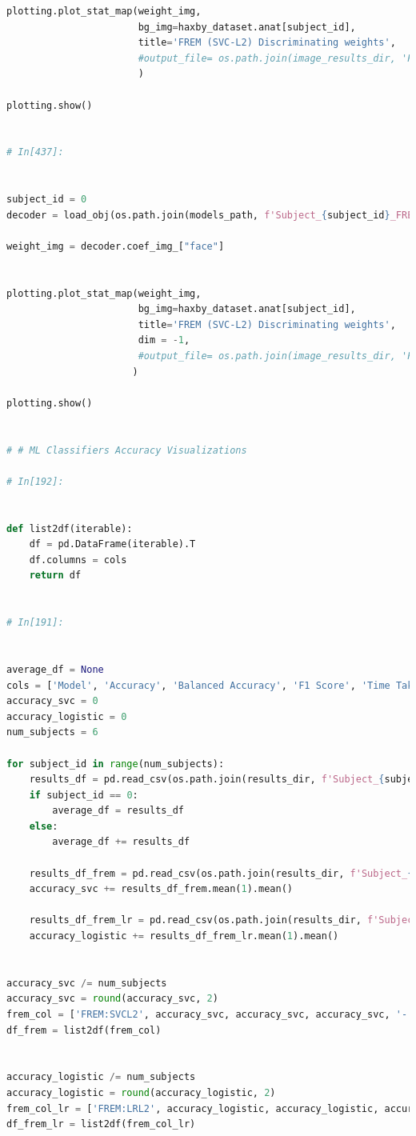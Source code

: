 \documentclass[10pt, twocolumn, letterpaper]{article}
\begin{document}
\begin{lstlisting}[language=Python]
plotting.plot_stat_map(weight_img,
                       bg_img=haxby_dataset.anat[subject_id],
                       title='FREM (SVC-L2) Discriminating weights',
                       #output_file= os.path.join(image_results_dir, 'FREM (SVC-L2) Discriminating weights.png'),
                       )

plotting.show()


# In[437]:


subject_id = 0
decoder = load_obj(os.path.join(models_path, f'Subject_{subject_id}_FREM_model'))

weight_img = decoder.coef_img_["face"]


plotting.plot_stat_map(weight_img,
                       bg_img=haxby_dataset.anat[subject_id],
                       title='FREM (SVC-L2) Discriminating weights',
                       dim = -1,
                       #output_file= os.path.join(image_results_dir, 'FREM (SVC-L2) Discriminating weights anat.png')
                      )

plotting.show()


# # ML Classifiers Accuracy Visualizations

# In[192]:


def list2df(iterable):
    df = pd.DataFrame(iterable).T
    df.columns = cols
    return df


# In[191]:


average_df = None
cols = ['Model', 'Accuracy', 'Balanced Accuracy', 'F1 Score', 'Time Taken']
accuracy_svc = 0
accuracy_logistic = 0
num_subjects = 6

for subject_id in range(num_subjects):
    results_df = pd.read_csv(os.path.join(results_dir, f'Subject_{subject_id}_lazy_results.csv')).sort_values(by = 'Model')
    if subject_id == 0:
        average_df = results_df
    else:
        average_df += results_df
        
    results_df_frem = pd.read_csv(os.path.join(results_dir, f'Subject_{subject_id}_FREMCV_results.csv'))
    accuracy_svc += results_df_frem.mean(1).mean() 
    
    results_df_frem_lr = pd.read_csv(os.path.join(results_dir, f'Subject_{subject_id}_FREMLogisticRegressionCV_results.csv'))
    accuracy_logistic += results_df_frem_lr.mean(1).mean() 
   
        
accuracy_svc /= num_subjects   
accuracy_svc = round(accuracy_svc, 2)
frem_col = ['FREM:SVCL2', accuracy_svc, accuracy_svc, accuracy_svc, '-']
df_frem = list2df(frem_col)


accuracy_logistic /= num_subjects   
accuracy_logistic = round(accuracy_logistic, 2)
frem_col_lr = ['FREM:LRL2', accuracy_logistic, accuracy_logistic, accuracy_logistic, '-']
df_frem_lr = list2df(frem_col_lr)


\end{lstlisting}
\end{document}
